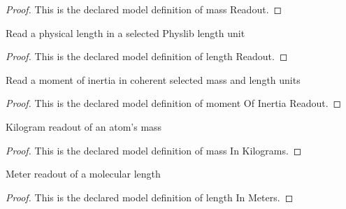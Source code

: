 \begin{proof}
  This is the declared model definition of mass Readout.
\end{proof}
\begin{definition}
  \label{def:physics:phyx-mini-0538:phyxminiproblems-problemphyxmini0538-lengthreadout}
  Read a physical length in a selected Physlib length unit
\end{definition}
\begin{proof}
  This is the declared model definition of length Readout.
\end{proof}
\begin{definition}
  \label{def:physics:phyx-mini-0538:phyxminiproblems-problemphyxmini0538-momentofinertiareadout}
  Read a moment of inertia in coherent selected mass and length units
\end{definition}
\begin{proof}
  This is the declared model definition of moment Of Inertia Readout.
\end{proof}
\begin{definition}
  \label{def:physics:phyx-mini-0538:phyxminiproblems-problemphyxmini0538-massinkilograms}
  Kilogram readout of an atom's mass
\end{definition}
\begin{proof}
  This is the declared model definition of mass In Kilograms.
\end{proof}
\begin{definition}
  \label{def:physics:phyx-mini-0538:phyxminiproblems-problemphyxmini0538-lengthinmeters}
  Meter readout of a molecular length
\end{definition}
\begin{proof}
  This is the declared model definition of length In Meters.
\end{proof}
